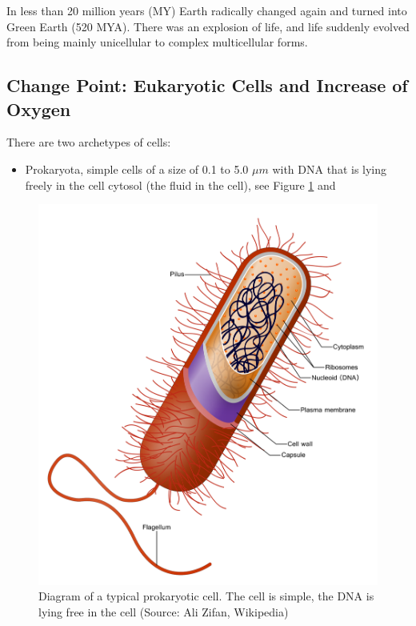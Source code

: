 \documentclass[
  11pt,
]{book}
\providecommand{\tightlist}{%
  \setlength{\itemsep}{0pt}\setlength{\parskip}{0pt}}
\begin{document}
In less than 20 million years (MY) Earth radically changed again and turned into Green Earth (520 MYA). There was an explosion of life, and life suddenly evolved from being mainly unicellular to complex multicellular forms.

\hypertarget{change-point-eukaryotic-cells-and-increase-of-oxygen}{%
\subsection{Change Point: Eukaryotic Cells and Increase of Oxygen}\label{change-point-eukaryotic-cells-and-increase-of-oxygen}}

There are two archetypes of cells:

\begin{itemize}
\tightlist
\item
  Prokaryota, simple cells of a size of 0.1 to 5.0 \(\mu m\) with DNA that is lying freely in the cell cytosol (the fluid in the cell), see Figure \ref{fig:prokaryotaCell} and
\end{itemize}

\begin{figure}

{\centering \includegraphics[width=0.5\linewidth]{./figs/prokaryoteCell} 

}

\caption{Diagram of a typical prokaryotic cell. The cell is simple, the DNA is lying free in the cell (Source: Ali Zifan, Wikipedia)}\label{fig:prokaryotaCell}
\end{figure}
\end{document}
